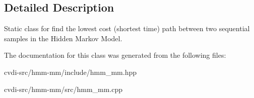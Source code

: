 \subsection{Detailed Description}
Static class for find the lowest cost (shortest time) path between two sequential samples in the Hidden Markov Model. 

The documentation for this class was generated from the following files\+:\begin{DoxyCompactItemize}
\item 
cvdi-\/src/hmm-\/mm/include/hmm\+\_\+mm.\+hpp\item 
cvdi-\/src/hmm-\/mm/src/hmm\+\_\+mm.\+cpp\end{DoxyCompactItemize}
